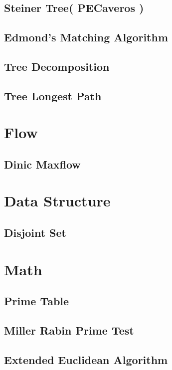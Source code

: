 \documentclass[10pt,twocolumn,oneside]{article}
\begin{document}
\subsection{Steiner Tree( PECaveros )}

\subsection{Edmond's Matching Algorithm}

\subsection{Tree Decomposition}

\subsection{Tree Longest Path}

\section{Flow}
\subsection{Dinic Maxflow}


\section{Data Structure}
\subsection{Disjoint Set}


\section{Math}
\subsection{Prime Table}

\subsection{Miller Rabin Prime Test}

\subsection{Extended Euclidean Algorithm}

\end{document}
